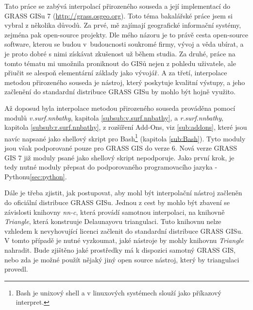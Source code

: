 \documentclass[12pt,a4paper]{article}
\begin{document}
\bigskip

Tato práce se zabývá interpolací přirozeného souseda a její
implementací do GRASS GISu 7 (\url{http://grass.osgeo.org}).
Toto téma bakalářské práce jsem si vybral z několika důvodů. Za prvé,
mě zajímají geografické informační systémy, zejména pak open-source
projekty. Dle mého názoru je to právě cesta open-source software,
kterou se budou v~budoucnosti soukromé firmy, vývoj a věda ubírat, a
je proto dobré s nimi získávat zkušenost už během studia. Za druhé,
práce na tomto tématu mi umožnila proniknout do GISů nejen z pohledu
uživatele, ale přiučit se alespoň elementární základy jako vývojář. A
za třetí, interpolace metodou přirozeného souseda je nástroj, který
poskytuje kvalitní výstupy, a jeho začlenění do standardní distribuce
GRASS GISu by mohlo být hojně využito.

Až doposud byla interpolace metodou přirozeného souseda prováděna
pomocí modulů \emph{v.surf.nnbathy}, kapitola \ref{subsub:v.surf.nnbathy}, a \emph{r.surf.nnbathy}, kapitola \ref{subsub:r.surf.nnbathy}, z
rozšíření Add-Ons, viz \ref{sub:addons}, které jsou navíc napsané jako shellový skript pro Bash\footnote{Bash je unixový shell a v linuxových systémech slouží jako příkazový interpret.} (kapitola \ref{sub:Bash}). Tyto moduly jsou
však podporované pouze pro GRASS GIS do verze 6. Nová verze GRASS GIS
7 již moduly psané jako shellový skript nepodporuje. Jako první krok, je tedy
nutné moduly přepsat do podporovaného programovacího jazyka - Pythonu\ref{sec:python}.

\newpage

Dále je třeba zjistit, jak postupovat, aby mohl být interpolační
nástroj začleněn do oficiální distribuce GRASS GISu. Jednou z cest by
mohlo být zbavení se závislosti knihovny \emph{nn-c}, která provádí
samotnou interpolaci, na knihovně \emph{Triangle}, která konstruuje
Delaunayovu triangulaci. Tuto knihovnu nelze vzhledem k nevyhovující
licenci začlenit do standardní distribuce GRASS GISu. V tomto případě
je nutné vyzkoumat, jaké nástroje by mohly knihovnu \emph{Triangle}
nahradit. Bude zjištěno jaké prostředky má k dispozici samotný GRASS
GIS, nebo zda je možné použít nějaký jiný open source nástroj, který
by triangulaci provedl.
\end{document}

